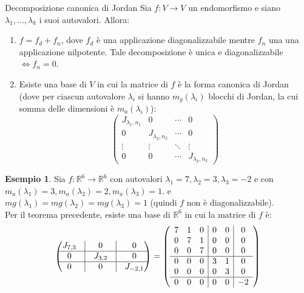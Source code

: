 \documentclass[a4paper]{article}
\theoremstyle{definition}
\newtheorem*{es}{Esempio}
\begin{document}
	\begin{teo}{Decomposizione canonica di Jordan}{}
		Sia $f: V \to V$ un endomorfismo e siano $\lambda_1, ..., \lambda_k$ i suoi autovalori. Allora:
		\begin{enumerate}
			\item $f = f_d + f_n$, dove $f_d$ è una applicazione diagonalizzabile mentre $f_n$ una una applicazione nilpotente.
			Tale decomposizione è unica e diagonalizzabile $\Leftrightarrow f_n = 0$.
			\item Esiste una base di $V$ in cui la matrice di $f$ è la forma canonica di Jordan
			(dove per ciascun autovalore $\lambda_i$ si hanno $m_g(\lambda_i)$ blocchi di Jordan, la cui somma delle dimensioni è $m_a(\lambda_i)$):
			\begin{equation*}
				\begin{pmatrix}
					J_{\lambda_1, n_1} & 0 & \cdots & 0 \\
					0 & J_{\lambda_2, n_2} & \cdots & 0 \\
					\vdots & \vdots & \ddots & \vdots \\
					0 & 0 & \cdots & J_{\lambda_k, n_k}
				\end{pmatrix}
			\end{equation*}
		\end{enumerate}
	\end{teo}

	\begin{es}
		Sia $f: \mathbb{R}^6 \to \mathbb{R}^6$ con autovalori $\lambda_1 = 7, \lambda_2 = 3, \lambda_3 = -2$ e con
		$m_a(\lambda_1) = 3, m_a(\lambda_2) = 2, m_a(\lambda_3) = 1$. e $mg(\lambda_1) = mg(\lambda_2) = mg(\lambda_3) = 1$ (quindi $f$ non è diagonalizzabile). \\
		Per il teorema precedente, esiste una base di $\mathbb{R}^6$ in cui la matrice di $f$ è:
		\begin{equation*}
			\begin{pmatrix}
				J_{7,3} & \vline & 0 & \vline & 0 \\
				\hline
				0 & \vline & J_{3,2} & \vline & 0 \\
				\hline
				0 & \vline & 0 & \vline & J_{-2,1}
			\end{pmatrix} = \left(
			\begin{array}{ccc|cc|c}
			7 & 1 & 0 & 0 & 0 & 0 \\
			0 & 7 & 1 & 0 & 0 & 0 \\
			0 & 0 & 7 & 0 & 0 & 0 \\
			\hline
			0 & 0 & 0 & 3 & 1 & 0 \\
			0 & 0 & 0 & 0 & 3 & 0 \\
			\hline
			0 & 0 & 0 & 0 & 0 & -2
			\end{array}
			\right)
		\end{equation*}
	\end{es}
\end{document}

